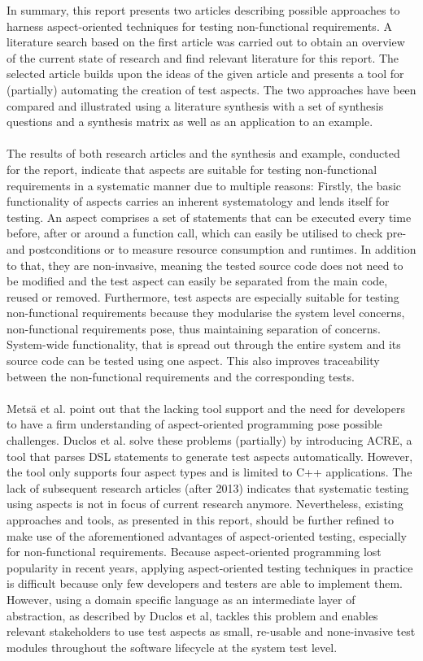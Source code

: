 In summary, this report presents two articles describing possible approaches to harness aspect-oriented techniques for testing non-functional requirements. A literature search based on the first article was carried out to obtain an overview of the current state of research and find relevant literature for this report. The selected article builds upon the ideas of the given article and presents a tool for (partially) automating the creation of test aspects. The two approaches have been compared and illustrated using a literature synthesis with a set of synthesis questions and a synthesis matrix as well as an application to an example.\\
\\ 
The results of both research articles and the synthesis and example, conducted for the report, indicate that aspects are suitable for testing non-functional requirements in a systematic manner due to multiple reasons: Firstly, the basic functionality of aspects carries an inherent systematology and lends itself for testing. An aspect comprises a set of statements that can be executed every time before, after or around a function call, which can easily be utilised to check pre- and postconditions or to measure resource consumption and runtimes. In addition to that, they are non-invasive, meaning the tested source code does not need to be modified and the test aspect can easily be separated from the main code, reused or removed. Furthermore, test aspects are especially suitable for testing non-functional requirements because they modularise the system level concerns, non-functional requirements pose, thus maintaining separation of concerns. System-wide functionality, that is spread out through the entire system and its source code can be tested using one aspect. This also improves traceability between the non-functional requirements and the corresponding tests.\\
\\ 
Metsä et al. point out that the lacking tool support and the need for developers to have a firm understanding of aspect-oriented programming pose possible challenges. Duclos et al. solve these problems (partially) by introducing ACRE, a tool that parses DSL statements to generate test aspects automatically.  However, the tool only supports four aspect types and is limited to C++ applications. The lack of subsequent research articles (after 2013) indicates that systematic testing using aspects is not in focus of current research anymore. Nevertheless, existing approaches and tools, as presented in this report, should be further refined to make use of the aforementioned advantages of aspect-oriented testing, especially for non-functional requirements. Because aspect-oriented programming lost popularity in recent years, applying aspect-oriented testing techniques in practice is difficult because only few developers and testers are able to implement them. However, using a domain specific language as an intermediate layer of abstraction, as described by Duclos et al, tackles this problem and enables relevant stakeholders to use test aspects as small, re-usable and none-invasive test modules throughout the software lifecycle at the system test level. 
